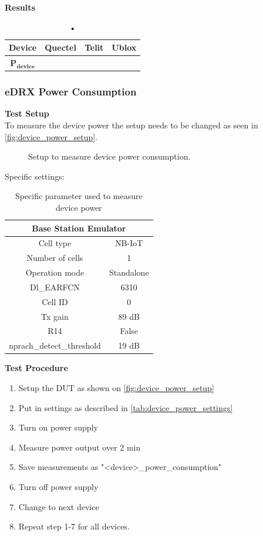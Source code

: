 \textbf{Results}\\
\begin{table}[H]
\centering
\begin{tabular}{|c|c|c|c|}\hline
\textbf{Device}	& Quectel	& Telit & Ublox \\ \hline
$\mathbf{P_{device}}$	& & & \\ \hline
\end{tabular}
\caption{•}
\label{tab:device_power_results}
\end{table}

\subsubsection{\gls{eDRX} Power Consumption}
\textbf{Test Setup}\\
To measure the device power the setup needs to be changed as seen in \autoref{fig:device_power_setup}.
\begin{figure}[H]
\centering
{}
\caption{Setup to measure device power consumption.}
\label{fig:device_power_setup}
\end{figure}

Specific settings:
\begin{table}[H]
\centering
\begin{tabular}{|c|c|} \hline
\multicolumn{2}{|c|}{\textbf{Base Station Emulator}} \\ \hline
Cell type          & NB-IoT         \\ \hline
Number of cells    & 1              \\ \hline
Operation mode     & Standalone     \\ \hline
Dl\_EARFCN         & 6310           \\ \hline
Cell ID            & 0              \\ \hline
Tx gain            & 89 dB          \\ \hline
R14                & False          \\ \hline
nprach\_detect\_threshold  & 19 dB  \\ \hline
\end{tabular}
\caption{Specific parameter used to measure device power}
\label{tab:device_power_settings}
\end{table}


\textbf{Test Procedure}\\
\begin{enumerate}
\item Setup the \gls{DUT} as shown on \autoref{fig:device_power_setup}
\item Put in settings as described in \autoref{tab:device_power_settings} 
\item Turn on power supply 
\item Measure power output over 2 min
\item Save measurements as "<device>\_power\_consumption"
\item Turn off power supply
\item Change to next device
\item Repeat step 1-7 for all devices.
\end{enumerate}

